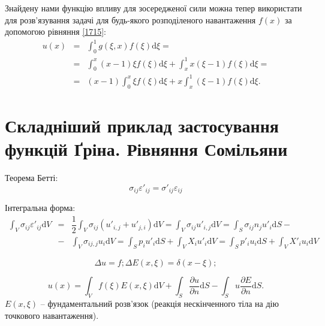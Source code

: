 \documentclass[14pt,twoside]{extreport}
\theoremstyle{mystyle}
\numberwithin{equation}{chapter}
\begin{document}
Знайдену нами функцію впливу для зосередженої сили можна тепер використати для розв'язування задачі для будь-якого розподіленого навантаження $f(x)$ за допомогою рівняння \eqref{1715}:
\begin{equation}
\begin{array}{lll}
u(x)&=&\displaystyle\int_{0}^{1}g(\xi, x)f(\xi)\mathrm{d}\xi=\\
&=&\displaystyle \int_{0}^{x} (x-1)\xi f(\xi)\mathrm{d}\xi+\int_{x}^{1}x(\xi -1 )f(\xi)\mathrm{d}\xi =\\
&=&(x-1)\displaystyle\int_{0}^{x}\xi f(\xi)\mathrm{d}\xi+x\displaystyle\int_{x}^{1}(\xi-1)f(\xi)\mathrm{d}\xi.
\end{array}
\end{equation}

\section{Складніший приклад застосування функцій Ґріна. Рівняння Сомільяни}

Теорема Бетті:
\begin{equation}
\sigma_{ij}\varepsilon'_{ij}=\sigma'_{ij}\varepsilon_{ij}
\end{equation}

Інтегральна форма:
\begin{equation}
\begin{array}{lll}
\displaystyle\int_{V} \sigma_{ij}\varepsilon'_{ij} \mathrm{d}V &=& \dfrac{1}{2} \displaystyle\int_{V} \sigma_{ij}\left(u'_{i,j} + u'_{j,i}\right)\mathrm{d}V=\displaystyle\int_{V} \sigma_{ij} u'_{i,j} \mathrm{d}V =\displaystyle\int_{S} \sigma_{ij}n_ju'_{i} \mathrm{d}S -\\
&-& \displaystyle\int_{V} \sigma_{ij,j} u_{i} \mathrm{d}V = \displaystyle\int_{S} p_{i} u'_{i} \mathrm{d}S + \int_{V} X_{i}u'_{i} \mathrm{d}V= \displaystyle\int_{S} p'_{i} u_{i} \mathrm{d}S + \displaystyle\int_{V} X'_{i}u_{i} \mathrm{d}V
\end{array}
\end{equation}

\begin{equation}
\Delta u=f; \Delta E(x,\xi)=\delta(x-\xi);
\end{equation}

\begin{equation}
u(x)=\displaystyle\int_{V} f(\xi) E(x,\xi)\mathrm{d}V + \displaystyle\int_{S} \dfrac{\partial u}{\partial n} \mathrm{d}S - \displaystyle\int_{S} u \dfrac{\partial E}{\partial n} \mathrm{d}S.
\end{equation}
$E(x,\xi)$ -- фундаментальний розв'язок (реакція нескінченного тіла на дію точкового навантаження).
\end{document}
